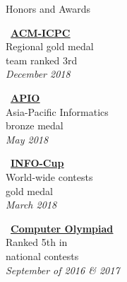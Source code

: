 \documentclass{resume} %
\begin{document}
\begin{rSection}{Honors and Awards}
\begin{footnotesize}
\begin{minipage}[t]{1.6in}
\begin{center}
\vspace{0.2cm}
    \faLink \ \href{http://icpc.sharif.edu/2018/scoreboard/}{\bf \underline{ACM-ICPC}}\\
    Regional gold medal\\
    team ranked 3rd\\
    \textcolor{Black!70}{\it December 2018}
\end{center}
\end{minipage}
\hspace{0.1cm}
\begin{minipage}[t]{1.6in}
\begin{center}
\vspace{0.2cm}
\faLink \ \href{https://apio2018.ru/results/official-contest/}{\bf \underline{APIO}}\\
Asia-Pacific Informatics\\
bronze medal \\
\textcolor{Black!70}{\it May 2018}
\end{center}
\end{minipage}
\hspace{0.1cm}
\begin{minipage}[t]{1.6in}
\begin{center}
\vspace{0.2cm}
\faLink \ \href{https://www.info1cup.com/archive/2018/International_Round_Ranking.pdf}{\bf \underline{INFO-Cup}} \\
World-wide contests\\
gold medal\\
\textcolor{Black!70}{\it March 2018}
\end{center}
\end{minipage}
\hspace{0.1cm}
\begin{minipage}[t]{1.9in}
\begin{center}
\vspace{0.2cm}
\faLink \ {\bf \href{https://ioinformatics.org/journal/v11si_2017_25_33.pdf}{\underline{Computer Olympiad}}} \\
Ranked 5th in\\
national contests\\
\textcolor{Black!70}{\it September of 2016 \& 2017}
\end{center}
\end{minipage}
\end{footnotesize}
\end{rSection}
\end{document}
